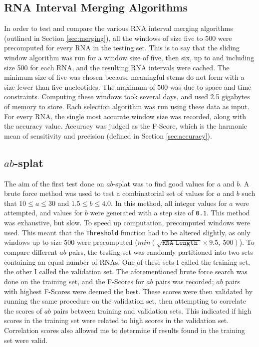 \documentclass{cshonours}
\begin{document}
\subsection{RNA Interval Merging Algorithms}
In order to test and compare the various RNA interval merging algorithms (outlined in Section \ref{sec:merging}), all the windows of size five to 500 were precomputed for every RNA in the testing set. This is to say that the sliding window algorithm was run for a window size of five, then six, up to and including size 500 for each RNA, and the resulting RNA intervals were cached. The minimum size of five was chosen because meaningful stems do not form with a size fewer than five nucleotides. The maximum of 500 was due to space and time constraints. Computing these windows took several days, and used 2.5 gigabytes of memory to store. Each selection algorithm was run using these data as input. For every RNA, the single most accurate window size was recorded, along with the accuracy value. Accuracy was judged as the F-Score, which is the harmonic mean of sensitivity and precision (defined in Section \ref{sec:accuracy}).


\subsection{$ab$-splat}

The aim of the first test done on $ab$-splat was to find good values for $a$ and $b$. A brute force method was used to test a combinatorial set of values for $a$ and $b$ such that $10 \leq a \leq 30$ and $1.5 \leq b \leq 4.0$. In this method, all integer values for $a$ were attempted, and values for $b$ were generated with a step size of \texttt{0.1}. This method was exhaustive, but slow. To speed up computation, precomputed windows were used. This meant that the \texttt{Threshold} function had to be altered slightly, as only windows up to size 500 were precomputed ($min(\sqrt{ \texttt {RNA Length } } \times 9.5, \: 500)$). To compare different $ab$ pairs, the testing set was randomly partitioned into two sets containing an equal number of RNAs. One of these sets I called the training set, the other I called the validation set. The aforementioned brute force search was done on the training set, and the F-Scores for $ab$ pairs was recorded; $ab$ pairs with highest F-Scores were deemed the best. These scores were then validated by running the same procedure on the validation set, then attempting to correlate the scores of $ab$ pairs between training and validation sets. This  indicated if high scores in the training set were related to high scores in the validation set. Correlation scores also allowed me to determine if results found in the training set were valid.
\end{document}
